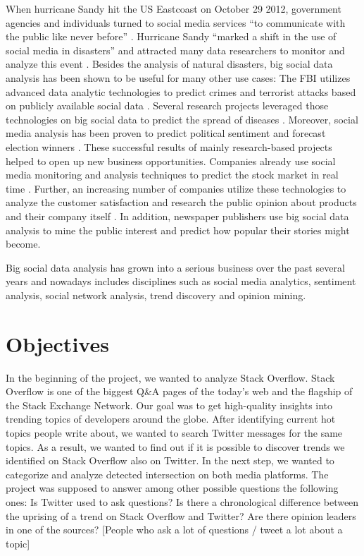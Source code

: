 When hurricane Sandy hit the US Eastcoast on October 29 2012, government agencies and individuals turned to social media services \enquote{to communicate with the public like never before} \cite{emergencymgmt2013sandy}. Hurricane Sandy \enquote{marked a shift in the use of social media in disasters} \cite[6]{security13sandy} and attracted many data researchers to monitor and analyze this event \cite{kumar2011tweettracker,carageamapping2014sandy}. Besides the analysis of natural disasters, big social data analysis has been shown to be useful for many other use cases: The FBI utilizes advanced data analytic technologies to predict crimes and terrorist attacks based on publicly available social data \cite{wang2012automatic}. Several research projects leveraged those technologies on big social data to predict the spread of diseases \cite{Google09detection,gft2014}. Moreover, social media analysis has been proven to predict political sentiment and forecast election winners \cite{bermingham2011using}. These successful results of mainly research-based projects helped to open up new business opportunities. Companies already use social media monitoring and analysis techniques to predict the stock market in real time \cite{bollen2011twitter,alcorn2013stockmarket}. Further, an increasing number of companies utilize these technologies to analyze the customer satisfaction and research the public opinion about products and their company itself \cite{journals/expert/CambriaSXH13}. In addition, newspaper publishers use big social data analysis to mine the public interest and predict how popular their stories might become.

Big social data analysis has grown into a serious business over the past several years and nowadays includes disciplines such as social media analytics, sentiment analysis, social network analysis, trend discovery and opinion mining.


\section{Objectives}
\label{sec:objectives}
In the beginning of the project, we wanted to analyze Stack Overflow. Stack Overflow is one of the biggest Q\&A pages of the today’s web and the flagship of the Stack Exchange Network.
Our goal was to get high-quality insights into trending topics of developers around the globe. 
After identifying current hot topics people write about, we wanted to search Twitter messages for the same topics. As a result, we wanted to find out if it is possible to discover trends we identified on Stack Overflow also on Twitter. In the next step, we wanted to categorize and analyze detected intersection on both media platforms. The project was supposed to answer among other possible questions the following ones: 
Is Twitter used to ask questions?
Is there a chronological difference between the uprising of a trend on Stack Overflow and Twitter?
Are there opinion leaders in one of the sources? [People who ask a lot of questions / tweet a lot about a topic]


